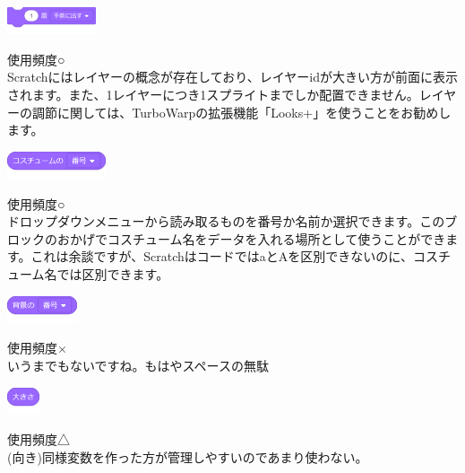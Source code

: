 \documentclass[b5paper,10pt]{jsarticle}
\begin{document}
\begin{multicols*}{3}
\begin{itembox}{12}
\includegraphics[height=8mm]{images/looks_17.png}
\end{itembox}
使用頻度○\\
Scratchにはレイヤーの概念が存在しており、レイヤーidが大きい方が前面に表示されます。また、1レイヤーにつき1スプライトまでしか配置できません。レイヤーの調節に関しては、TurboWarpの拡張機能「Looks+」を使うことをお勧めします。
\begin{itembox}{13}
\includegraphics[height=8mm]{images/looks_18.png}
\end{itembox}
使用頻度○\\
ドロップダウンメニューから読み取るものを番号か名前か選択できます。このブロックのおかげでコスチューム名をデータを入れる場所として使うことができます。これは余談ですが、ScratchはコードではaとAを区別できないのに、コスチューム名では区別できます。
\begin{itembox}{14}
\includegraphics[height=8mm]{images/looks_19.png}
\end{itembox}
使用頻度×\\
いうまでもないですね。もはやスペースの無駄
\begin{itembox}{15}
\includegraphics[height=8mm]{images/looks_20.png}
\end{itembox}
使用頻度△\\
(向き)同様変数を作った方が管理しやすいのであまり使わない。


\end{multicols*}
\end{document}
